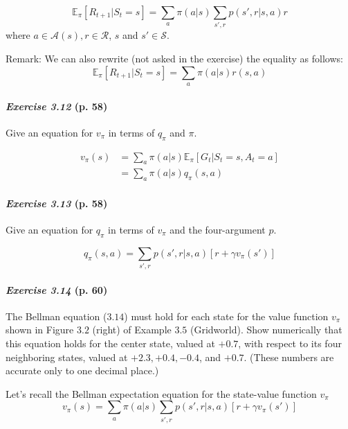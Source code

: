 \documentclass[10pt,a4paper]{article}
\begin{document}
\bigskip
\begin{equation}
\mathbb{E}_\pi[R_{t+1} \lvert S_t=s] = \sum_{a} \pi(a \lvert s) \sum_{s', r} p(s', r \lvert s, a) r
\end{equation}
where $a \in \mathcal{A}(s), r \in \mathcal{R}$, $s$ and $s' \in \mathcal{S}$.

Remark: We can also rewrite (not asked in the exercise) the equality as follows:
\begin{equation}
\mathbb{E}_\pi[R_{t+1} \lvert S_t=s] = \sum_{a} \pi(a \lvert s) r(s, a)
\end{equation}

\paragraph{\textit{Exercise 3.12} (p. 58)} Give an equation for $v_\pi$ in terms of $q_\pi$ and $\pi$.

\bigskip
\begin{equation}
\begin{split}
v_\pi(s) &= \sum_{a} \pi(a \lvert s) \mathbb{E}_\pi[G_t \lvert S_t = s, A_t = a]\\
&= \sum_{a} \pi(a \lvert s) q_\pi(s, a)
\end{split}
\end{equation}

\paragraph{\textit{Exercise 3.13} (p. 58)} Give an equation for $q_\pi$ in terms of $v_\pi$ and the four-argument $p$.

\bigskip
\begin{equation}
q_\pi(s, a) = \sum_{s', r} p(s', r \lvert s, a) \left[r + \gamma v_\pi(s') \right]
\end{equation}

\paragraph{\textit{Exercise 3.14} (p. 60)} The Bellman equation ($3.14$) must hold for each state for the value function $v_\pi$ shown in Figure $3.2$ (right) of Example $3.5$ (Gridworld). Show numerically that this equation holds for the center state, valued at $+0.7$, with respect to its four neighboring states, valued at
$+2.3, +0.4, -0.4$, and $+0.7$. (These numbers are accurate only to one decimal place.)

\bigskip
Let's recall the Bellman expectation equation for the state-value function $v_\pi$
\begin{equation}
v_\pi(s) = \sum_{a} \pi(a \lvert s) \sum_{s', r} p(s', r \lvert s, a) \left[r + \gamma v_\pi(s')\right]
\end{equation}
\end{document}
